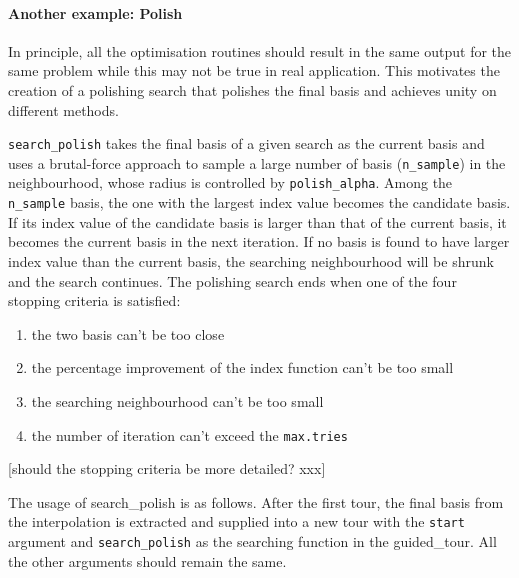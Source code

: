\documentclass[12pt]{article}
\providecommand{\tightlist}{%
  \setlength{\itemsep}{0pt}\setlength{\parskip}{0pt}}
\begin{document}
\hypertarget{another-example-polish}{%
\paragraph{Another example: Polish}\label{another-example-polish}}

In principle, all the optimisation routines should result in the same
output for the same problem while this may not be true in real
application. This motivates the creation of a polishing search that
polishes the final basis and achieves unity on different methods.

\texttt{search\_polish} takes the final basis of a given search as the
current basis and uses a brutal-force approach to sample a large number
of basis (\texttt{n\_sample}) in the neighbourhood, whose radius is
controlled by \texttt{polish\_alpha}. Among the \texttt{n\_sample}
basis, the one with the largest index value becomes the candidate basis.
If its index value of the candidate basis is larger than that of the
current basis, it becomes the current basis in the next iteration. If no
basis is found to have larger index value than the current basis, the
searching neighbourhood will be shrunk and the search continues. The
polishing search ends when one of the four stopping criteria is
satisfied:

\begin{enumerate}
\def\labelenumi{\arabic{enumi})}
\tightlist
\item
  the two basis can't be too close
\item
  the percentage improvement of the index function can't be too small
\item
  the searching neighbourhood can't be too small
\item
  the number of iteration can't exceed the \texttt{max.tries}
\end{enumerate}

{[}should the stopping criteria be more detailed? xxx{]}

The usage of search\_polish is as follows. After the first tour, the
final basis from the interpolation is extracted and supplied into a new
tour with the \texttt{start} argument and \texttt{search\_polish} as the
searching function in the guided\_tour. All the other arguments should
remain the same.
\end{document}
